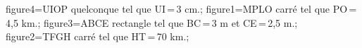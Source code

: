 \documentclass[exercice]{thedocument}%
\begin{document}
%
    \>figure4=UIOP quelconque tel que UI\,=\,3 cm.;%
    \>figure1=MPLO carré tel que PO\,=\,4,5 km.;%
    \>figure3=ABCE rectangle tel que BC\,=\,3 m et CE\,=\,2,5 m.;%
    \>figure2=TFGH carré tel que HT\,=\,70 km.;%
\end{document}
